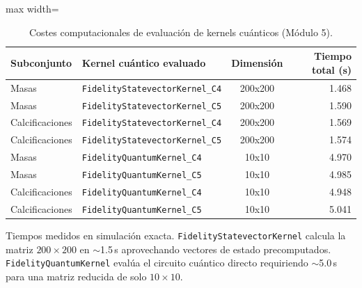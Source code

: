 \begin{table}[H]
\centering
\small
\caption{Costes computacionales de evaluación de kernels cuánticos (Módulo 5).}
\label{tab:anexo_m5_tiempos}
\begin{adjustbox}{max width=\linewidth}
\begin{tabular}{l l c r}
\toprule
Subconjunto & Kernel cuántico evaluado & Dimensión & Tiempo total (s) \\
\midrule
Masas & \texttt{FidelityStatevectorKernel\_C4} & 200x200 & 1.468 \\
Masas & \texttt{FidelityStatevectorKernel\_C5} & 200x200 & 1.590 \\
Calcificaciones & \texttt{FidelityStatevectorKernel\_C4} & 200x200 & 1.569 \\
Calcificaciones & \texttt{FidelityStatevectorKernel\_C5} & 200x200 & 1.574 \\
Masas & \texttt{FidelityQuantumKernel\_C4} & 10x10 & 4.970 \\
Masas & \texttt{FidelityQuantumKernel\_C5} & 10x10 & 4.985 \\
Calcificaciones & \texttt{FidelityQuantumKernel\_C4} & 10x10 & 4.948 \\
Calcificaciones & \texttt{FidelityQuantumKernel\_C5} & 10x10 & 5.041 \\
\bottomrule
\end{tabular}
\end{adjustbox}
\par\smallskip
\parbox{0.95\linewidth}{\footnotesize Tiempos medidos en simulación exacta. \texttt{FidelityStatevectorKernel} calcula la matriz $200\times 200$ en $\sim$1.5\,s aprovechando vectores de estado precomputados. \texttt{FidelityQuantumKernel} evalúa el circuito cuántico directo requiriendo $\sim$5.0\,s para una matriz reducida de solo $10\times 10$.}
\end{table}
